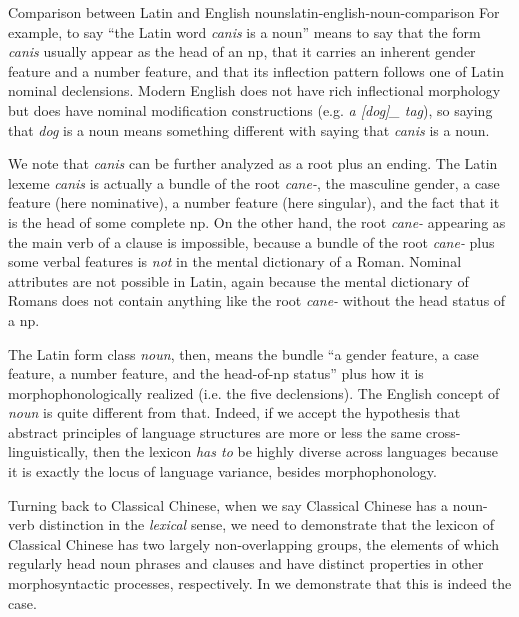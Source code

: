 \documentclass[UTF8, a4paper, oneside, scheme=plain, 12pt]{ctexrep}
\newcommand*{\term}[1]{\emph{#1}}
\newcommand{\form}[1]{\emph{#1}}
\begin{document}
\begin{theorybox}{Comparison between Latin and English nouns}{latin-english-noun-comparison}
    For example, to say ``the Latin word \form{canis} is a noun'' 
    means to say that the form \form{canis} usually appear as the head of an \ac{np},
    that it carries an inherent gender feature and a number feature,
    and that its inflection pattern follows one of Latin nominal declensions.
    Modern English does not have rich inflectional morphology
    but does have nominal modification constructions (e.g. \form{a [dog]_{} tag}),
    so saying that \form{dog} is a noun means something different with 
    saying that \form{canis} is a noun.

    We note that \form{canis} can be further analyzed as a root plus an ending.
    The Latin lexeme \form{canis} is actually a bundle of the root 
    \form{cane-}, the masculine gender, a case feature (here nominative),
    a number feature (here singular),
    and the fact that it is the head of some complete \ac{np}.
    On the other hand, the root \form{cane-} appearing as the main verb of a clause is impossible,
    because a bundle of the root \form{cane-} plus some verbal features
    is \emph{not} in the mental dictionary of a Roman.
    Nominal attributes are not possible in Latin,
    again because the mental dictionary of Romans does not contain anything like
    the root \form{cane-} without the head status of a \ac{np}.

    The Latin form class \term{noun}, then,
    means the bundle ``a gender feature, a case feature, a number feature, and the head-of-\ac{np} status''
    plus how it is morphophonologically realized (i.e. the five declensions).
    The English concept of \term{noun} is quite different from that.
    Indeed, if we accept the hypothesis that abstract principles of language structures 
    are more or less the same cross-linguistically,
    then the lexicon \emph{has to} be highly diverse across languages
    because it is exactly the locus of language variance, besides morphophonology.
    
    Turning back to Classical Chinese, when we say Classical Chinese has a noun-verb distinction in the \emph{lexical} sense,
    we need to demonstrate that the lexicon of Classical Chinese has two largely non-overlapping groups,
    the elements of which regularly head noun phrases and clauses and have distinct properties in other morphosyntactic processes, respectively.
    In  we demonstrate that this is indeed the case.
\end{theorybox}
\end{document}
